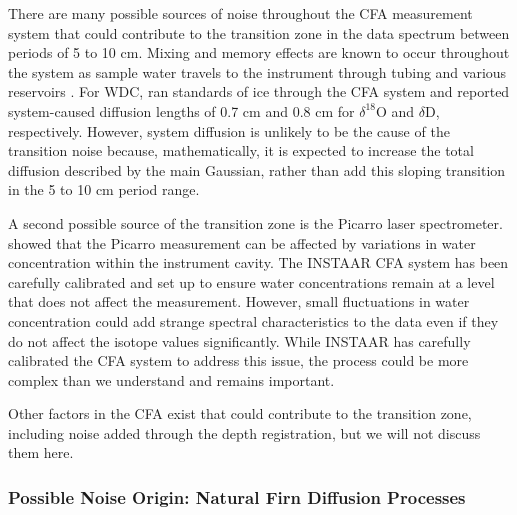\documentclass[draft, jgrga]{AGUTeX}
\begin{document}
\begin{article}
There are many possible sources of noise throughout the CFA measurement system that could contribute to the transition zone in the data spectrum between periods of 5 to 10 cm. Mixing and memory effects are known to occur throughout the system as sample water travels to the instrument through tubing and various reservoirs \citep{Gkinis2011a}. For WDC, \citet{Jones2017b} ran standards of ice through the CFA system and reported system-caused diffusion lengths of 0.7 cm and 0.8 cm for $\delta^{18}$O and $\delta$D, respectively. However, system diffusion is unlikely to be the cause of the transition noise because, mathematically, it is expected to increase the total diffusion described by the main Gaussian, rather than add this sloping transition in the 5 to 10 cm period range.

A second possible source of the transition zone is the Picarro laser spectrometer. \citet{Gkinis2011b} showed that the Picarro measurement can be affected by variations in water concentration within the instrument cavity. The INSTAAR CFA system has been carefully calibrated and set up to ensure water concentrations remain at a level that does not affect the measurement. However, small fluctuations in water concentration could add strange spectral characteristics to the data even if they do not affect the isotope values significantly. While INSTAAR has carefully calibrated the CFA system to address this issue, the process could be more complex than we understand and remains important.

Other factors in the CFA exist that could contribute to the transition zone, including noise added through the depth registration, but we will not discuss them here.


\subsubsection{Possible Noise Origin: Natural Firn Diffusion Processes}


\end{article}
\end{document}
